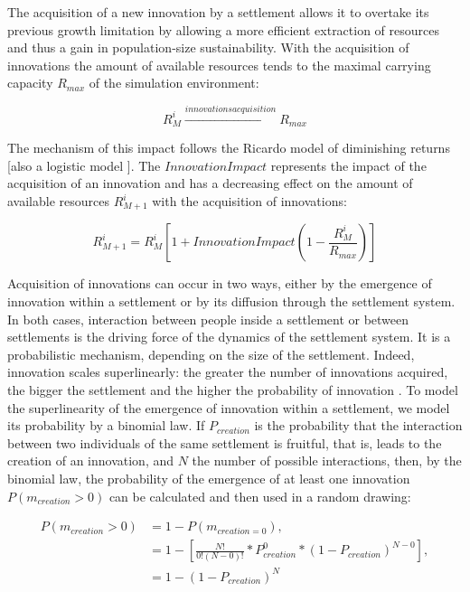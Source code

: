 The acquisition of a new innovation by a settlement allows it to overtake its previous growth limitation by allowing a more efficient extraction of resources and thus a gain in population-size sustainability. With the acquisition of innovations the amount of available resources tends to the maximal carrying capacity $R_{max}$ of the simulation environment:

\begin{equation}
R^{i}_{M} \xrightarrow{innovations acquisition} R_{max}
\end{equation}

The mechanism of this impact follows the Ricardo model of diminishing returns [also a logistic model \autocite{Turchin2003}]. The $InnovationImpact$ represents the impact of the acquisition of an innovation and has a decreasing effect on the amount of available resources $R^{i}_{M+1}$ with the acquisition of innovations:

\begin{equation}
R^{i}_{M+1} = R^{i}_{M} \left[ 1 + InnovationImpact \left( 1 - \frac{R^{i}_{M}}{R_{max}}\right)\right]
\end{equation}

Acquisition of innovations can occur in two ways, either by the emergence of innovation within a settlement or by its diffusion through the settlement system. In both cases, interaction between people inside a settlement or between settlements is the driving force of the dynamics of the settlement system. It is a probabilistic mechanism, depending on the size of the settlement. Indeed, innovation scales superlinearly: the greater the number of innovations acquired, the bigger the settlement and the higher the probability of innovation \autocites{Arthur2009, Diamond1997, Lane2009}. To model the superlinearity of the emergence of innovation within a settlement, we model its probability by a binomial law. If $P_{creation}$ is the probability that the interaction between two individuals of the same settlement is fruitful, that is, leads to the creation of an innovation, and $N$ the number of possible interactions, then, by the binomial law, the probability of the emergence of at least one innovation $P(m_{creation} > 0)$ can be calculated and then used in a random drawing:

\begin{equation}
\begin{split}
P(m_{creation} > 0) & =  1 - P\left(m_{creation = 0}\right),  \\
& = 1 - \left[   \frac{N!}{0!(N - 0)!} * P^{0}_{creation} * (1 - P_{creation})^{N - 0}  \right], \\
& = 1 - \left( 1 - P_{creation} \right)^{N}
\end{split}
\end{equation}

